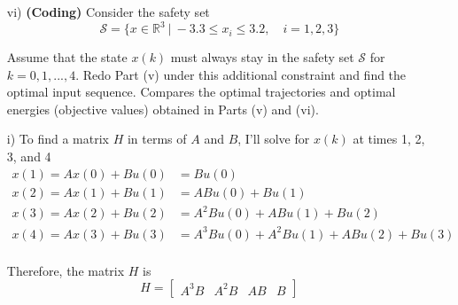 \begin{homeworkProblem}
\begin{itemize}
        \item [vi)] \textbf{(Coding)} Consider the safety set 
            \begin{equation}
                \mathcal S=\{x \in \mathbb R^3 \ | \ -3.3 \leq x_i \leq 3.2,
                \quad i=1,2,3\}
            \end{equation}
            
            Assume that the state $x(k)$ must always stay in the safety set 
            $\mathcal S$ for $k=0,1,...,4$. Redo Part (v) under this additional 
            constraint and find the optimal input sequence. Compares the 
            optimal trajectories and optimal energies (objective values) 
            obtained in Parts (v) and (vi). 
    \end{itemize}

    \begin{solution}
        \begin{itemize}
            \item[i)] To find a matrix $H$ in terms of $A$ and $B$, I'll solve 
                for $x(k)$ at times 1, 2, 3, and 4
                \[
                    \begin{split}
                        x(1) = Ax(0) + Bu(0) &= Bu(0) \\
                        x(2) = Ax(1) + Bu(1) &= ABu(0) + Bu(1) \\
                        x(3) = Ax(2) + Bu(2) &= A^2Bu(0) + ABu(1) + Bu(2) \\
                        x(4) = Ax(3) + Bu(3) &= A^3Bu(0) + A^2Bu(1) + ABu(2) 
                        + Bu(3) \\
                    \end{split}
                \]
                
                Therefore, the matrix $H$ is
                \[
                    H = \left[ \begin{matrix} A^3B & A^2B & AB & B 
                    \end{matrix} \right]
                \]
                

\end{itemize}
\end{solution}
\end{homeworkProblem}
